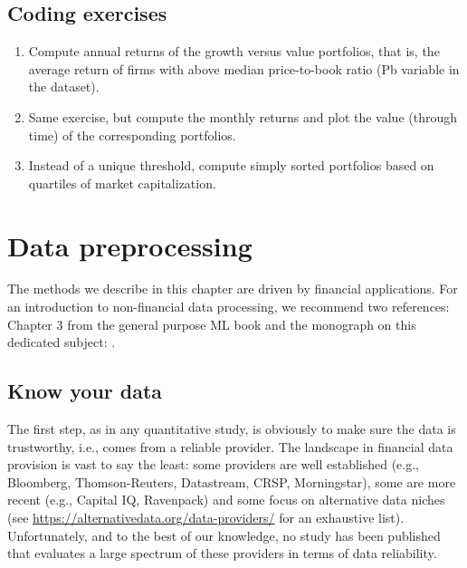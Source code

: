 \documentclass[]{krantz}
\providecommand{\tightlist}{%
  \setlength{\itemsep}{0pt}\setlength{\parskip}{0pt}}
\theoremstyle{definition}
\theoremstyle{definition}
\theoremstyle{definition}
\theoremstyle{remark}
\begin{document}
\hypertarget{coding-exercises}{%
\section{Coding exercises}\label{coding-exercises}}

\begin{enumerate}
\def\labelenumi{\arabic{enumi}.}
\tightlist
\item
  Compute annual returns of the growth versus value portfolios, that is,
  the average return of firms with above median price-to-book ratio (Pb
  variable in the dataset).\\
\item
  Same exercise, but compute the monthly returns and plot the value
  (through time) of the corresponding portfolios.\\
\item
  Instead of a unique threshold, compute simply sorted portfolios based
  on quartiles of market capitalization.
\end{enumerate}

\hypertarget{Data}{%
\chapter{Data preprocessing}\label{Data}}

The methods we describe in this chapter are driven by financial
applications. For an introduction to non-financial data processing, we
recommend two references: Chapter 3 from the general purpose ML book
\citet{boehmke2019hands} and the monograph on this dedicated subject:
\citet{kuhn2019feature}.

\hypertarget{know-your-data}{%
\section{Know your data}\label{know-your-data}}

The first step, as in any quantitative study, is obviously to make sure
the data is trustworthy, i.e., comes from a reliable provider. The
landscape in financial data provision is vast to say the least: some
providers are well established (e.g., Bloomberg, Thomson-Reuters,
Datastream, CRSP, Morningstar), some are more recent (e.g., Capital IQ,
Ravenpack) and some focus on alternative data niches (see
\url{https://alternativedata.org/data-providers/} for an exhaustive
list). Unfortunately, and to the best of our knowledge, no study has
been published that evaluates a large spectrum of these providers in
terms of data reliability.
\end{document}
